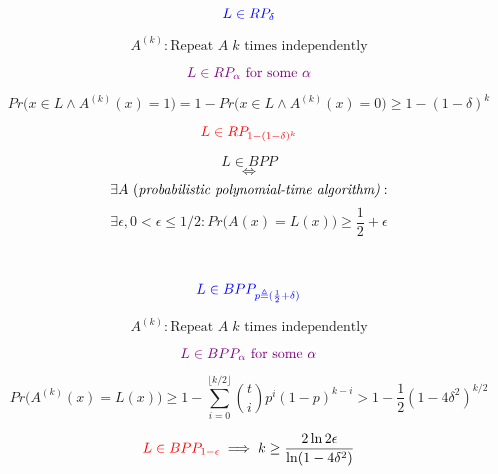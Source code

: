 \begin{frame}
  \[
	\textcolor{blue}{L \in RP_{\delta}}
  \]

  \pause
  \[
	A^{(k)}: \text{Repeat } A\; k \text{ times independently}
  \]

  \pause
  \begin{center}
  \end{center}

  \pause
  \[
	\textcolor{violet}{L \in RP_{\alpha} \text{ for some } \alpha}
  \]

  \pause
  \[
	Pr\Big(x \in L \land A^{(k)}(x) = 1\Big) = 1 - Pr\Big(x \in L \land A^{(k)}(x) = 0\Big) \ge 1- (1-\delta)^{k}
  \]

  \pause
  \[
	\textcolor{red}{L \in RP_{1-(1-\delta)^{k}}}
  \]
\end{frame}

\begin{frame}
  \begin{definition}
	\[
	  L \in BPP
	\]
	\[
	  \iff
	\]
	\[
	  \exists A \text{ (\it probabilistic polynomial-time algorithm)}: 
	\]
	\[
	  \exists \epsilon, 0 < \epsilon \le 1/2: Pr\Big(A(x) = L(x)\Big) \ge \frac{1}{2} + \epsilon
	\]
  \end{definition}

  \pause
  \begin{center}
	 \\[8pt] \pause
  \end{center}
\end{frame}

\begin{frame}
  \[
	\textcolor{blue}{L \in BPP_{p \triangleq (\frac{1}{2} + \delta)}}
  \]

  \pause
  \[
	A^{(k)}: \text{Repeat } A\; k \text{ times independently}
  \]

  \pause
  \begin{center}
  \end{center}

  \pause
  \[
	\textcolor{violet}{L \in BPP_{\alpha} \text{ for some } \alpha}
  \]

  \pause
  \[
	Pr\Big(A^{(k)}(x) = L(x)\Big) \ge 1 - \sum_{i=0}^{\lfloor k/2 \rfloor} \binom{t}{i} p^i (1-p)^{k-i} > 1 - \frac{1}{2}(1-4\delta^2)^{k/2}
  \]

  \pause
  \[
	\textcolor{red}{L \in BPP_{1 - \epsilon}} \implies k \ge \frac{2 \ln 2\epsilon}{\ln (1-4\delta^2)}
  \]
\end{frame}

